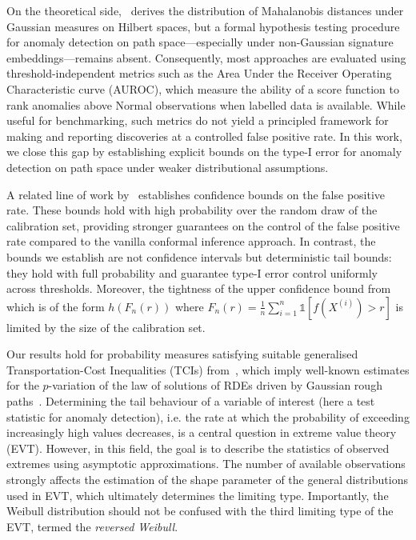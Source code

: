 \documentclass[twoside,11pt]{article}
\numberwithin{equation}{section}
\numberwithin{theorem}{section}
\begin{document}
On the theoretical side,~\citet{cass2024variance} derives the distribution of Mahalanobis distances under Gaussian measures on Hilbert spaces, but a formal hypothesis testing procedure for anomaly detection on path space---especially under non-Gaussian signature embeddings---remains absent. Consequently, most approaches are evaluated using threshold-independent metrics such as the Area Under the Receiver Operating Characteristic curve (AUROC), which measure the ability of a score function to rank anomalies above Normal observations when labelled data is available. While useful for benchmarking, such metrics do not yield a principled framework for making and reporting discoveries at a controlled false positive rate. In this work, we close this gap by establishing explicit bounds on the type-$\mathrm{I}$ error for anomaly detection on path space under weaker distributional assumptions. 


A related line of work by~\citet{bates2023testing} establishes confidence bounds on the false positive rate. These bounds hold with high probability over the random draw of the calibration set, providing stronger guarantees on the control of the false positive rate compared to the vanilla conformal inference approach. In contrast, the bounds we establish are not confidence intervals but deterministic tail bounds: they hold with full probability and guarantee type-$\mathrm{I}$ error control uniformly across thresholds. Moreover, the tightness of the upper confidence bound from~\cite{bates2023testing} which is of the form $h(F_n(r))$ where $F_n(r)=\frac{1}{n}\sum_{i=1}^{n}\mathds{1}[f(X^{(i)})>r]$ is limited by the size of the calibration set. 

Our results hold for probability measures satisfying suitable generalised Transportation-Cost Inequalities (TCIs) from~\cite{gasteratos2023transportation}, which imply well-known estimates for the $p$-variation of the law of solutions of RDEs driven by Gaussian rough paths~\citep{cass2013integrability}. Determining the tail behaviour of a variable of interest (here a test statistic for anomaly detection), i.e. the
rate at which the probability of exceeding increasingly high values decreases, is a central question in extreme value theory (EVT). However, in this field, the goal is to describe the statistics of observed extremes using asymptotic approximations. The number of available observations strongly affects the estimation of the shape parameter of the general distributions used in EVT, which ultimately determines the limiting type. Importantly, the Weibull distribution should not be confused with the third limiting type of the EVT, termed the \emph{reversed Weibull}. 
\end{document}
